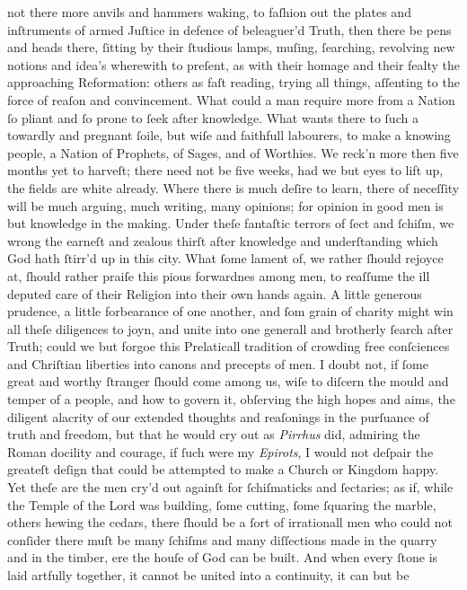 not there more anvils and hammers waking, to faſhion out the plates and
inſtruments of armed Juſtice in defence of beleaguer'd Truth, then there be pens
and heads there, ſitting by their ſtudious lamps, muſing, ſearching, revolving
new notions and idea's wherewith to preſent, as with their homage and their
fealty the approaching Reformation: others as faſt reading, trying all things,
aſſenting to the force of reaſon and convincement.  What could a man require
more from a Nation ſo pliant and ſo prone to ſeek after knowledge.  What wants
there to ſuch a towardly and pregnant ſoile, but wiſe and faithfull labourers,
to make a knowing people, a Nation of Prophets, of Sages, and of Worthies.  We
reck'n more then five months yet to harveſt; there need not be five weeks, had
we but eyes to lift up, the fields are white already.  Where there is much
deſire to learn, there of neceſſity will be much arguing, much writing, many
opinions; for opinion in good men is but knowledge in the making.  Under theſe
fantaſtic terrors of ſect and ſchiſm, we wrong the earneſt and zealous thirſt
after knowledge and underſtanding which God hath ſtirr'd up in this city.  What
ſome lament of, we rather ſhould rejoyce at, ſhould rather praiſe this pious
forwardnes among men, to reaſſume the ill deputed care of their Religion into
their own hands again.  A little generous prudence, a little forbearance of one
another, and ſom grain of charity might win all theſe diligences to joyn, and
unite into one generall and brotherly ſearch after Truth; could we but forgoe
this Prelaticall tradition of crowding free conſciences and Chriſtian liberties
into canons and precepts of men.  I doubt not, if ſome great and worthy ſtranger
ſhould come among us, wiſe to diſcern the mould and temper of a people, and how
to govern it, obſerving the high hopes and aims, the diligent alacrity of our
extended thoughts and reaſonings in the purſuance of truth and freedom, but that
he would cry out as \textit{Pirrhus} did, admiring the Roman docility and
courage, if ſuch were my \textit{Epirots}, I would not deſpair the greateſt
deſign that could be attempted to make a Church or Kingdom happy.  Yet theſe are
the men cry'd out againſt for ſchiſmaticks and ſectaries; as if, while the
Temple of the Lord was building, ſome cutting, ſome ſquaring the marble, others
hewing the cedars, there ſhould be a ſort of irrationall men who could not
conſider there muſt be many ſchiſms and many diſſections made in the quarry and
in the timber, ere the houſe of God can be built.  And when every ſtone is laid
artfully together, it cannot be united into a continuity, it can but be
